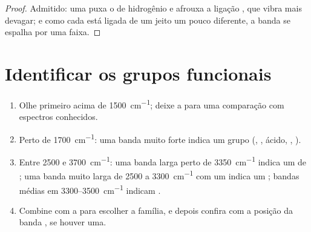 \begin{proof}
Admitido: uma  puxa o  de hidrogênio e afrouxa
a ligação , que vibra mais devagar; e como cada  está
ligada de um jeito um pouco diferente, a banda se espalha por uma faixa.
\end{proof}

\section{Identificar os grupos funcionais}


\begin{method}\label{met:g11:infrared:reading}
\begin{enumerate}
  \item Olhe primeiro acima de \qty{1500}{cm^{-1}}; deixe a  para uma comparação com espectros conhecidos.
  \item Perto de \qty{1700}{cm^{-1}}: uma banda muito forte indica um
        grupo  (, , ácido, , ).
  \item Entre 2500 e \qty{3700}{cm^{-1}}: uma banda larga perto de
        \qty{3350}{cm^{-1}} indica um  de ; uma banda muito
        larga de 2500 a \qty{3300}{cm^{-1}} com um  indica um
        ; bandas médias em 3300--\qty{3500}{cm^{-1}}
        indicam .
  \item Combine com a  para escolher a família, e
        depois confira com a posição da banda , se houver uma.
\end{enumerate}
\end{method}


